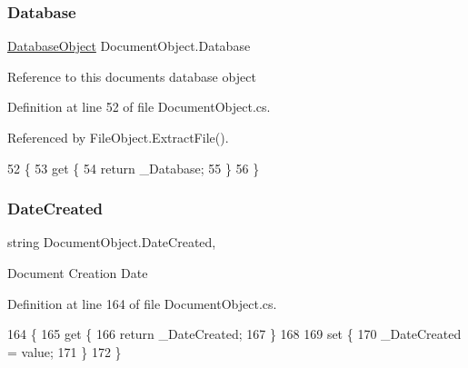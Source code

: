 \subsubsection{\texorpdfstring{Database}{Database}}
{\footnotesize\ttfamily \mbox{\hyperlink{class_database_object}{Database\+Object}} Document\+Object.\+Database\hspace{0.3cm}{\ttfamily [get]}}



Reference to this documents database object 



Definition at line 52 of file Document\+Object.\+cs.



Referenced by File\+Object.\+Extract\+File().


\begin{DoxyCode}
52                                    \{
53         \textcolor{keyword}{get} \{
54             \textcolor{keywordflow}{return} \_Database;
55         \}
56     \}
\end{DoxyCode}
\mbox{\label{class_document_object_a819cb8baad094f6e5990c54ec1eee8b0}} 
\subsubsection{\texorpdfstring{Date\+Created}{DateCreated}}
{\footnotesize\ttfamily string Document\+Object.\+Date\+Created\hspace{0.3cm}{\ttfamily [get]}, {\ttfamily [set]}}



Document Creation Date 



Definition at line 164 of file Document\+Object.\+cs.


\begin{DoxyCode}
164                               \{
165         \textcolor{keyword}{get} \{
166             \textcolor{keywordflow}{return} \_DateCreated;
167         \}
168 
169         \textcolor{keyword}{set} \{
170             \_DateCreated = value;
171         \}
172     \}
\end{DoxyCode}
\mbox{\label{class_document_object_a87ba1b3ac1b74b104972c25b245c504b}} 
